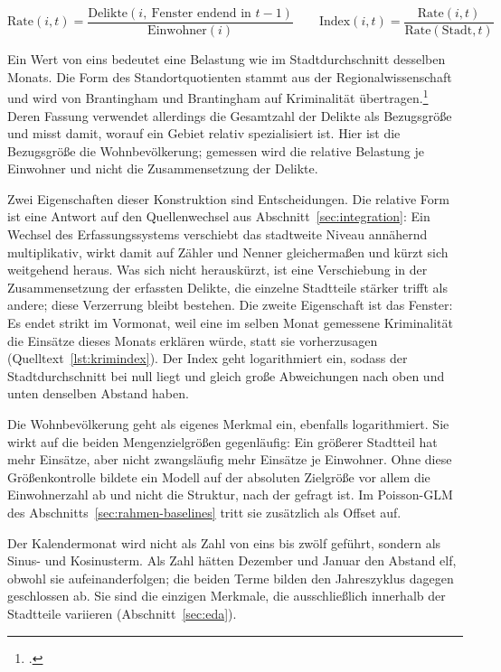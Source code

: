 \begin{equation*}
  \mathrm{Rate}(i,t) =
  \frac{\mathrm{Delikte}(i,\ \text{Fenster endend in } t-1)}{\mathrm{Einwohner}(i)}
  \qquad
  \mathrm{Index}(i,t) = \frac{\mathrm{Rate}(i,t)}{\mathrm{Rate}(\mathrm{Stadt},t)}
\end{equation*}

Ein Wert von eins bedeutet eine Belastung wie im Stadtdurchschnitt desselben
Monats. Die Form des Standortquotienten stammt aus der Regionalwissenschaft und
wird von Brantingham und Brantingham auf Kriminalität
übertragen.\footcite[268-269]{Brantingham1997} Deren Fassung verwendet
allerdings die Gesamtzahl der Delikte als Bezugsgröße und misst damit, worauf
ein Gebiet relativ spezialisiert ist. Hier ist die Bezugsgröße die
Wohnbevölkerung; gemessen wird die relative Belastung je Einwohner und nicht
die Zusammensetzung der Delikte.

Zwei Eigenschaften dieser Konstruktion sind Entscheidungen. Die relative Form
ist eine Antwort auf den Quellenwechsel aus Abschnitt~\ref{sec:integration}: Ein
Wechsel des Erfassungssystems verschiebt das stadtweite Niveau annähernd
multiplikativ, wirkt damit auf Zähler und Nenner gleichermaßen und kürzt sich
weitgehend heraus. Was sich nicht herauskürzt, ist eine Verschiebung in der
Zusammensetzung der erfassten Delikte, die einzelne Stadtteile stärker trifft
als andere; diese Verzerrung bleibt bestehen. Die zweite Eigenschaft ist das
Fenster: Es endet strikt im Vormonat, weil eine im selben Monat gemessene
Kriminalität die Einsätze dieses Monats erklären würde, statt sie
vorherzusagen (Quelltext~\ref{lst:krimindex}). Der Index geht logarithmiert
ein, sodass der Stadtdurchschnitt bei null liegt und gleich große Abweichungen
nach oben und unten denselben Abstand haben.

Die Wohnbevölkerung geht als eigenes Merkmal ein, ebenfalls logarithmiert. Sie
wirkt auf die beiden Mengenzielgrößen gegenläufig: Ein größerer Stadtteil hat
mehr Einsätze, aber nicht zwangsläufig mehr Einsätze je Einwohner. Ohne diese
Größenkontrolle bildete ein Modell auf der absoluten Zielgröße vor allem die
Einwohnerzahl ab und nicht die Struktur, nach der gefragt ist. Im Poisson-GLM
des Abschnitts~\ref{sec:rahmen-baselines} tritt sie zusätzlich als Offset auf.

Der Kalendermonat wird nicht als Zahl von eins bis zwölf geführt, sondern als
Sinus- und Kosinusterm. Als Zahl hätten Dezember und Januar den Abstand elf,
obwohl sie aufeinanderfolgen; die beiden Terme bilden den Jahreszyklus dagegen
geschlossen ab. Sie sind die einzigen Merkmale, die ausschließlich innerhalb
der Stadtteile variieren (Abschnitt~\ref{sec:eda}).

